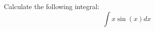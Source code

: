 \documentclass{exam}
\begin{document}
\begin{questions}
\begin{question}
Calculate the following integral:
\[
\int x \sin(x) dx
\]
\end{question}
\end{questions}
\end{document}
